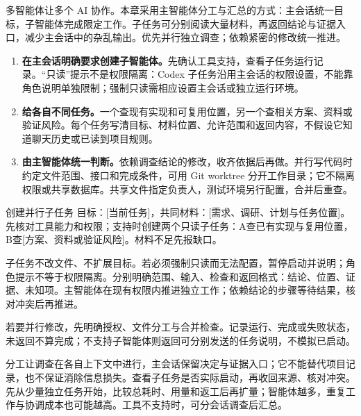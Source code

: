 多智能体让多个 AI 协作。本章采用主智能体分工与汇总的方式：主会话统一目标，子智能体完成限定工作。子任务可分别阅读大量材料，再返回结论与证据入口，减少主会话中的杂乱输出。优先并行独立调查；依赖紧密的修改统一推进。
\begin{enumerate}
\item \textbf{在主会话明确要求创建子智能体。}先确认工具支持，查看子任务运行记录。“只读”提示不是权限隔离：Codex 子任务沿用主会话的权限设置，不能靠角色说明单独限制；强制只读需相应设置主会话或独立运行环境。
\item \textbf{给各自不同任务。}一个查现有实现和可复用位置，另一个查相关方案、资料或验证风险。每个任务写清目标、材料位置、允许范围和返回内容，不假设它知道聊天历史或已读到项目规则。
\item \textbf{由主智能体统一判断。}依赖调查结论的修改，收齐依据后再做。并行写代码时约定文件范围、接口和完成条件，可用 Git worktree 分开工作目录；它不隔离权限或共享数据库。共享文件指定负责人，测试环境另行配置，合并后重查。
\end{enumerate}
\begin{prompt}{创建并行子任务}
目标：[当前任务]，共同材料：[需求、调研、计划与任务位置]。先核对工具能力和权限；支持时创建两个只读子任务：A查已有实现与复用位置，B查[方案、资料或验证风险]。材料不足先报缺口。\par
子任务不改文件、不扩展目标。若必须强制只读而无法配置，暂停启动并说明；角色提示不等于权限隔离。分别明确范围、输入、检查和返回格式：结论、位置、证据、未知项。主智能体在现有权限内推进独立工作；依赖结论的步骤等待结果，核对冲突后再推进。\par
若要并行修改，先明确授权、文件分工与合并检查。记录运行、完成或失败状态，未返回不算完成；不支持子智能体则返回可分别发送的任务说明，不模拟已启动。
\end{prompt}
分工让调查在各自上下文中进行，主会话保留决定与证据入口；它不能替代项目记录，也不保证消除信息损失。查看子任务是否实际启动，再收回来源、核对冲突。先从少量独立任务开始，比较总耗时、用量和返工后再扩量；智能体越多，重复工作与协调成本也可能越高。工具不支持时，可分会话调查后汇总。

